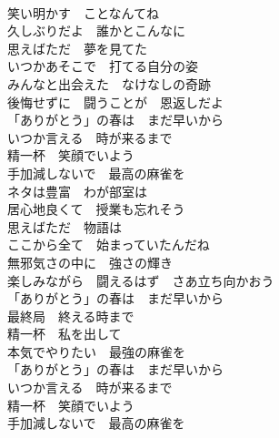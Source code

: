 {\albumName}
{\quad\\\kasho
笑い明かす　ことなんてね\\
久しぶりだよ　誰かとこんなに\\
思えばただ　夢を見てた\\
いつかあそこで　打てる自分の姿\\

みんなと出会えた　なけなしの奇跡\\
後悔せずに　闘うことが　恩返しだよ\\

「ありがとう」の春は　まだ早いから\\
いつか言える　時が来るまで\\
精一杯　笑顔でいよう\\
手加減しないで　最高の麻雀を\\

ネタは豊富　わが部室は\\
居心地良くて　授業も忘れそう\\
思えばただ　物語は\\
ここから全て　始まっていたんだね\\

無邪気さの中に　強さの輝き\\
楽しみながら　闘えるはず　さあ立ち向かおう\\

「ありがとう」の春は　まだ早いから\\
最終局　終える時まで\\
精一杯　私を出して\\
本気でやりたい　最強の麻雀を\\

「ありがとう」の春は　まだ早いから\\
いつか言える　時が来るまで\\
精一杯　笑顔でいよう\\
手加減しないで　最高の麻雀を
}

